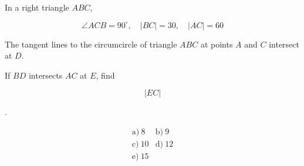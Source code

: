 In a right triangle \(ABC\),



\[
\angle ACB=90^\circ,\quad |BC|=30,\quad |AC|=60
\]

The tangent lines to the circumcircle of triangle \(ABC\) at points \(A\) and \(C\) intersect at \(D\).



If \(BD\) intersects \(AC\) at \(E\), find



\[
|EC|
\]

.



\[
\begin{array}{ll}
\text{a)}\ 8 & \text{b)}\ 9 \\
\text{c)}\ 10 & \text{d)}\ 12 \\
\text{e)}\ 15
\end{array}
\]
